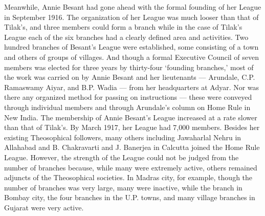 \begin{multicols}{2}
Meanwhile, Annie Besant had gone ahead with the formal founding of her League in September 1916. The organization of her League was much looser than that of Tilak's, and three members could form a branch while in the case of Tilak's League each of the six branches had a clearly defined area and activities. Two hundred branches of Besant's League were established, some consisting of a town and others of groups of villages. And though a formal Executive Council of seven members was elected for three years by thirty-four `founding branches,' most of the work was carried on by Annie Besant and her lieutenants --- Arundale, C.P. Ramaswamy Aiyar, and B.P. Wadia --- from her headquarters at Adyar. Nor was there any organized method for passing on instructions --- these were conveyed through individual members and through Arundale's column on Home Rule in New India. The membership of Annie Besant's League increased at a rate slower than that of Tilak's. By March 1917, her League had 7,000 members. Besides her existing Theosophical followers, many others including Jawaharlal Nehru in Allahabad and B. Chakravarti and J. Banerjea in Calcutta joined the Home Rule League. However, the strength of the League could not be judged from the number of branches because, while many were extremely active, others remained adjuncts of the Theosophical societies. In Madras city, for example, though the number of branches was very large, many were inactive, while the branch in Bombay city, the four branches in the U.P. towns, and many village branches in Gujarat were very active.


\end{multicols}

